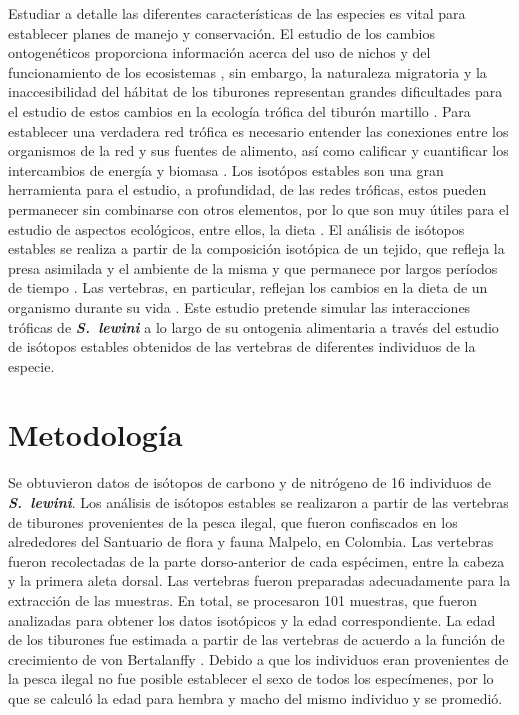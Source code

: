 \documentclass[12pt, letterpaper] {article}
\begin{document}
Estudiar  a detalle las diferentes caracter\'isticas de las especies es vital para establecer planes de manejo y conservaci\'on.  El estudio de los cambios ontogen\'eticos proporciona informaci\'on acerca del uso de nichos y del funcionamiento de los ecosistemas \cite{newsome}, sin embargo, la naturaleza migratoria y la inaccesibilidad del h\'abitat de los tiburones representan grandes dificultades para el estudio de estos cambios en la ecolog\'ia tr\'ofica del tibur\'on martillo \cite{hazen}.  Para establecer una verdadera red tr\'ofica es necesario entender las conexiones entre los organismos de la red y sus fuentes de alimento, as\'i como calificar y cuantificar los intercambios de energ\'ia y biomasa \cite {kling, vander}.  Los isot\'opos estables son una gran herramienta para el estudio, a profundidad, de las redes tr\'oficas, estos pueden permanecer sin combinarse con otros elementos, por lo que son muy \'utiles para el estudio de aspectos ecol\'ogicos, entre ellos, la dieta \cite{zanden}.   El an\'alisis de is\'otopos estables se realiza a partir de la composici\'on isot\'opica de un tejido, que refleja la presa asimilada y el ambiente de la misma y que permanece por largos per\'iodos de tiempo \cite{kim}.  Las vertebras, en particular, reflejan los cambios en la dieta de un organismo durante su vida \cite{koch}.  Este estudio pretende simular las interacciones tr\'oficas de \textbf{\textit{S.\ lewini}} a lo largo de su ontogenia alimentaria a trav\'es del estudio de is\'otopos estables obtenidos de las vertebras de diferentes individuos de la especie.







\section{Metodolog\'ia}

Se obtuvieron datos de is\'otopos de carbono y de nitr\'ogeno de 16 individuos de  \textbf{\textit{S.\ lewini}}. Los an\'alisis de is\'otopos estables se realizaron a partir de las vertebras de tiburones provenientes de la pesca ilegal, que fueron confiscados en los alrededores del Santuario de flora y fauna Malpelo, en  Colombia. Las vertebras fueron recolectadas de la parte dorso-anterior de cada esp\'ecimen, entre la cabeza y la primera aleta dorsal. Las vertebras fueron preparadas adecuadamente para la extracción de las muestras. En total, se procesaron 101 muestras, que fueron analizadas para obtener los datos isot\'opicos y la edad correspondiente.
La edad de los tiburones fue estimada a partir de las vertebras de acuerdo a la funci\'on de crecimiento de von Bertalanffy \cite{tolentino}. Debido a que los individuos eran provenientes de la pesca ilegal no fue posible establecer el sexo de todos los espec\'imenes, por lo que se calcul\'o la edad para hembra y  macho del mismo individuo y se promedi\'o.
\end{document}
